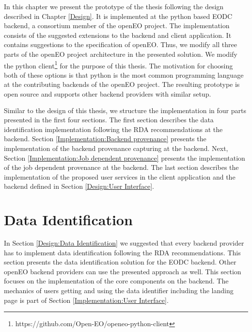 \documentclass[draft,final]{vutinfth} %
\begin{document}
In this chapter we present the prototype of the thesis following the design described in Chapter \ref{Design}. It is implemented at the python based EODC backend, a consortium member of the openEO project. The implementation consists of the suggested extensions to the backend and client application. It contains suggestions to the specification of openEO. Thus, we modify all three parts of the openEO project architecture in the presented solution. We modify the python client\footnote{https://github.com/Open-EO/openeo-python-client} for the purpose of this thesis. The motivation for choosing both of these options is that python is the most common programming language at the contributing backends of the openEO project. The resulting prototype is open source and supports other backend providers with similar setup.  

Similar to the design of this thesis, we structure the implementation in four parts presented in the first four sections. The first section describes the data identification implementation following the RDA recommendations at the backend. Section \ref{Implementation:Backend provenance} presents the implementation of the backend provenance capturing at the backend. Next, Section \ref{Implementation:Job dependent provenance} presents the implementation of the job dependent provenance at the backend. The last section describes the implementation of the proposed user services in the client application and the backend defined in Section \ref{Design:User Interface}.     

\section{Data Identification}\label{Implementation:Data Identification}

In Section \ref{Design:Data Identification} we suggested that every backend provider has to implement data identification following the RDA recommendations. This section presents the data identification solution for the EODC backend. Other openEO backend providers can use the presented approach as well. This section focuses on the implementation of the core components on the backend. The mechanics of users getting and using the data identifier including the landing page is part of Section \ref{Implementation:User Interface}. \\
\end{document}
